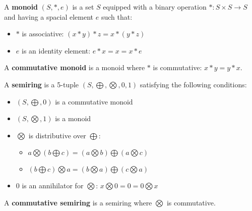 
\begin{definition}[Monoid]
    A \textbf{monoid} $(S, *, e)$ is a set $S$ equipped with a binary operation $* : S \times S \rightarrow S$ and having a spacial element $e$ such that:
    \begin{itemize}
        \item {$*$ is associative:} $ (x * y) * z = x * (y * z)$
        \item {$e$ is an identity element:} $  e * x = x = x * e$
    \end{itemize}
    A \textbf{commutative monoid} is a monoid where $*$ is commutative: $x * y = y * x$.
\end{definition}

\begin{definition}[Semiring]
    \label{def_semiring}
        A \textbf{semiring} is a 5-tuple $(S,\bigoplus,\bigotimes,0,1)$ satisfying the following conditions:
         \begin{itemize}
            \item {$(S,\bigoplus,0)$ is a commutative monoid} 
            \item {$(S,\bigotimes,1)$ is a monoid} 
            \item {$\bigotimes$ is distributive over $\bigoplus$:}
            \begin{itemize}
                \item $a \bigotimes ( b \bigoplus c) = (a \bigotimes b) \bigoplus (a \bigotimes c)$ 
                \item $(b \bigoplus c) \bigotimes a = (b \bigotimes a) \bigoplus (c \bigotimes a)$
            \end{itemize} 
            \item {0 is an annihilator for $\bigotimes$:} $x \bigotimes 0= 0 =  0 \bigotimes x $
        \end{itemize}
        A \textbf{commutative semiring} is a semiring where $\bigotimes$ is commutative.
\end{definition}

